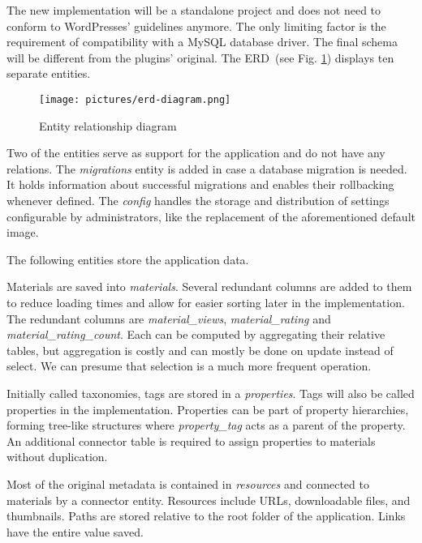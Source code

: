 \documentclass[
  digital,     %
  oneside,     %
  nosansbold,  %
  colorbold, %
  lof,         %
  lot,         %
]{fithesis4}
\newcommand{\imgref}[1]{(see Fig. \ref{fig:#1})}
\begin{document}
The new implementation will be a standalone project and does not need to conform to WordPresses'
guidelines anymore. The only limiting factor is the requirement of compatibility with a MySQL
database driver. The final schema will be different from the plugins' original. The ERD~\imgref{erd}
displays ten separate entities.

\begin{figure}
	\begin{center}
		\begin{minipage}{1\textwidth}
			\texttt{[image: pictures/erd-diagram.png]}
		\end{minipage}
	\end{center}
	\caption{Entity relationship diagram}
	\label{fig:erd}
\end{figure}

Two of the entities serve as support for the application and do not have any relations. The
\textit{migrations} entity is added in case a database migration is needed. It holds information about
successful migrations and enables their rollbacking whenever defined. The \textit{config} handles the
storage and distribution of settings configurable by administrators, like the replacement of the
aforementioned default image.

The following entities store the application data.

Materials are saved into \textit{materials}. Several redundant columns are added to them to reduce
loading times and allow for easier sorting later in the implementation. The redundant columns are
\textit{material\_views}, \textit{material\_rating} and \textit{material\_rating\_count}. Each can be
computed by aggregating their relative tables, but aggregation is costly and can mostly be done on
update instead of select. We can presume that selection is a much more frequent operation.

Initially called taxonomies, tags are stored in a \textit{properties}. Tags will also be called properties
in the implementation. Properties can be part of property hierarchies, forming tree-like structures
where \textit{property\_tag} acts as a parent of the property. An additional connector table is
required to assign properties to materials without duplication.

Most of the original metadata is contained in \textit{resources} and connected to materials by a
connector entity. Resources include URLs, downloadable files, and thumbnails. Paths are stored
relative to the root folder of the application. Links have the entire value saved.
\end{document}
